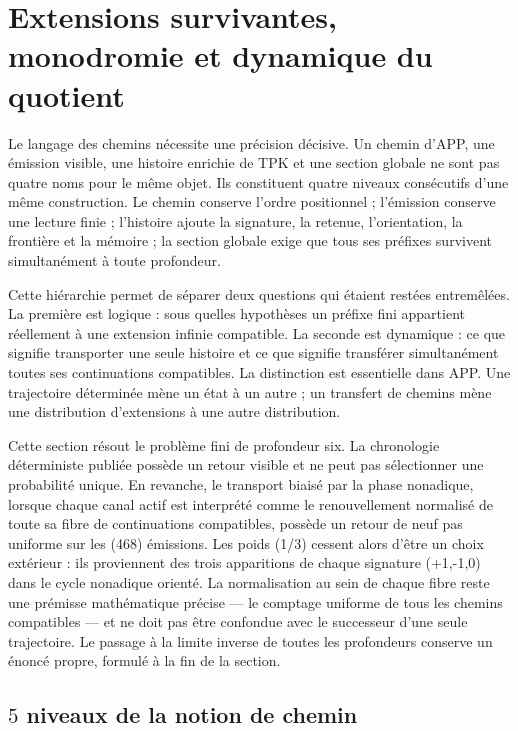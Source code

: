 \chapter{Extensions survivantes, monodromie et dynamique du quotient}
\label{chap:extensiones-dinamica-cociente}

Le langage des chemins nécessite une précision décisive. Un chemin
d'APP, une émission visible, une histoire enrichie de TPK et une section
globale ne sont pas quatre noms pour le même objet. Ils constituent quatre niveaux
consécutifs d'une même construction. Le chemin conserve l'ordre
positionnel ; l'émission conserve une lecture finie ; l'histoire ajoute la signature,
la retenue, l'orientation, la frontière et la mémoire ; la section globale exige que tous
ses préfixes survivent simultanément à toute profondeur.

Cette hiérarchie permet de séparer deux questions qui étaient restées
entremêlées. La première est logique : sous quelles hypothèses un préfixe fini
appartient réellement à une extension infinie compatible. La seconde est
dynamique : ce que signifie transporter une seule histoire et ce que signifie
transférer simultanément toutes ses continuations compatibles. La
distinction est essentielle dans APP\@. Une trajectoire déterminée mène un état à
un autre ; un transfert de chemins mène une distribution d'extensions à
une autre distribution.

Cette section résout le problème fini de profondeur six. La
chronologie déterministe publiée possède un retour visible et ne peut pas sélectionner
une probabilité unique. En revanche, le transport biaisé par la phase nonadique,
lorsque chaque canal actif est interprété comme le renouvellement normalisé de toute
sa fibre de continuations compatibles, possède un retour de neuf pas
uniforme sur les (468) émissions. Les poids (1/3) cessent alors d'être
un choix extérieur : ils proviennent des trois apparitions de chaque signature
(+1,-1,0) dans le cycle nonadique orienté. La normalisation au sein de chaque fibre reste
une prémisse mathématique précise --- le comptage uniforme de tous les
chemins compatibles --- et ne doit pas être confondue avec le successeur d'une seule
trajectoire. Le passage à la limite inverse de toutes les profondeurs conserve un
énoncé propre, formulé à la fin de la section.

\section{\(5\) niveaux de la notion de chemin}

